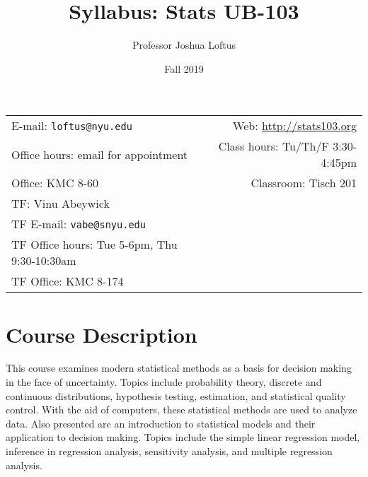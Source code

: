 \documentclass[11pt]{article}
\title{Syllabus: Stats UB-103}
\author{Professor Joshua Loftus}
\date{Fall 2019}
\newcommand{\blankline}{\quad\pagebreak[2]}
\begin{document}
\maketitle

\blankline

\begin{tabular*}{.93\textwidth}{@{\extracolsep{\fill}}lr}


E-mail: \texttt{loftus@nyu.edu} & Web: \url{http://stats103.org}  \\

 Office hours: email for appointment  &  Class hours: Tu/Th/F 3:30-4:45pm \\

 Office: KMC 8-60 & Classroom: Tisch 201 \\
TF: Vinu Abeywick \\
TF E-mail: \texttt{vabe@snyu.edu} & \\
TF Office hours: Tue 5-6pm, Thu 9:30-10:30am &  \\
TF Office: KMC 8-174 \\
\hline
\end{tabular*}

\vspace{5 mm}


\section*{Course Description}

This course examines modern statistical methods as a basis for decision making in the face of uncertainty. Topics include probability theory, discrete and continuous distributions, hypothesis testing, estimation, and statistical quality control. With the aid of computers, these statistical methods are used to analyze data. Also presented are an introduction to statistical models and their application to decision making. Topics include the simple linear regression model, inference in regression analysis, sensitivity analysis, and multiple regression analysis.

\end{document}
